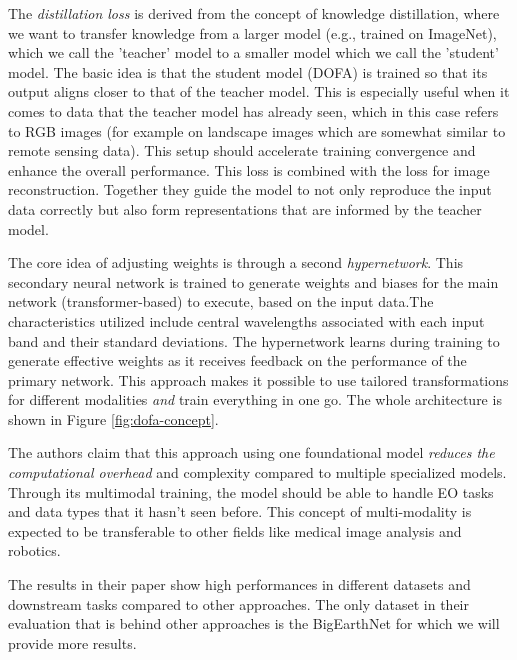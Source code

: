 The \emph{distillation loss} is derived from the concept of knowledge distillation, where we want to transfer knowledge from a larger model (e.g., trained on ImageNet), which we call the 'teacher' model to a smaller model which we call the 'student' model. The basic idea is that the student model (DOFA) is trained so that its output aligns closer to that of the teacher model. This is especially useful when it comes to data that the teacher model has already seen, which in this case refers to RGB images (for example on landscape images which are somewhat similar to remote sensing data). This setup should accelerate training convergence and enhance the overall performance. This loss is combined with the loss for image reconstruction. Together they guide the model to not only reproduce the input data correctly but also form representations that are informed by the teacher model.

The core idea of adjusting weights is through a second \emph{hypernetwork}. This secondary neural network is trained to generate weights and biases for the main network (transformer-based) to execute, based on the input data.The characteristics utilized include central wavelengths associated with each input band and their standard deviations. The hypernetwork learns during training to generate effective weights as it receives feedback on the performance of the primary network. This approach makes it possible to use tailored transformations for different modalities \emph{and} train everything in one go. The whole architecture is shown in Figure \ref{fig:dofa-concept}.

The authors claim that this approach using one foundational model \emph{reduces the computational overhead} and complexity compared to multiple specialized models. Through its multimodal training, the model should be able to handle EO tasks and data types that it hasn't seen before. This concept of multi-modality is expected to be transferable to other fields like medical image analysis and robotics.

The results in their paper show high performances in different datasets and downstream tasks compared to other approaches. The only dataset in their evaluation that is behind other approaches is the BigEarthNet for which we will provide more results.

\cite{dofa}